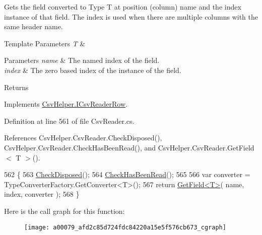 Gets the field converted to Type T at position (column) name and the index instance of that field. The index is used when there are multiple columns with the same header name. 


\begin{DoxyTemplParams}{Template Parameters}
{\em T} & \\
\hline
\end{DoxyTemplParams}

\begin{DoxyParams}{Parameters}
{\em name} & The named index of the field.\\
\hline
{\em index} & The zero based index of the instance of the field.\\
\hline
\end{DoxyParams}
\begin{DoxyReturn}{Returns}

\end{DoxyReturn}


Implements \hyperlink{a00117_aa8c349da18823eb8c30911d891b3e3bc}{Csv\-Helper.\-I\-Csv\-Reader\-Row}.



Definition at line 561 of file Csv\-Reader.\-cs.



References Csv\-Helper.\-Csv\-Reader.\-Check\-Disposed(), Csv\-Helper.\-Csv\-Reader.\-Check\-Has\-Been\-Read(), and Csv\-Helper.\-Csv\-Reader.\-Get\-Field$<$ T $>$().


\begin{DoxyCode}
562         \{
563             \hyperlink{a00079_a6fa45a46ed1322dc1872ca2321b5edbc}{CheckDisposed}();
564             \hyperlink{a00079_a2d9249171ed1568e45d152766d364c31}{CheckHasBeenRead}();
565 
566             var converter = TypeConverterFactory.GetConverter<T>();
567             \textcolor{keywordflow}{return} \hyperlink{a00079_a6a43cfaf39caea93ecd87e506be7b404}{GetField<T>}( name, index, converter );
568         \}
\end{DoxyCode}


Here is the call graph for this function\-:
\nopagebreak
\begin{figure}[H]
\begin{center}
\leavevmode
\texttt{[image: a00079\_afd2c85d724fdc84220a15e5f576cb673\_cgraph]}
\end{center}
\end{figure}


